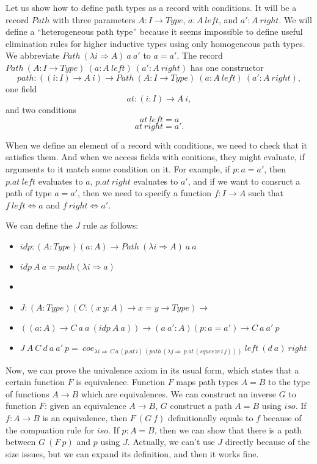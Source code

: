 \documentclass{amsart}
\theoremstyle{definition}
\theoremstyle{remark}
\newcommand{\red}{\Rightarrow}
\newcommand{\deq}{\Leftrightarrow}
\numberwithin{figure}{section}
\begin{document}
Let us show how to define path types as a record with conditions.
It will be a record $Path$ with three parameters $A : I \to Type$, $a : A\ left$, and $a' : A\ right$.
We will define a ``heterogeneous path type'' because it seems impossible to define useful elimination rules for higher inductive types using only homogeneous path types.
We abbreviate $Path\ (\lambda i \red A)\ a\ a'$ to $a = a'$.
The record $Path\ (A : I \to Type)\ (a : A\ left)\ (a' : A\ right)$ has one constructor
\[ path : ((i : I) \to A\ i) \to Path\ (A : I \to Type)\ (a : A\ left)\ (a' : A\ right), \]
one field
\[ at : (i : I) \to A\ i, \]
and two conditions
\[ at\ left = a \]
\[ at\ right = a'. \]

When we define an element of a record with conditions, we need to check that it satisfies them.
And when we access fields with conitions, they might evaluate, if arguments to it match some condition on it.
For example, if $p : a = a'$, then $p.at\ left$ evaluates to $a$, $p.at\ right$ evaluates to $a'$,
and if we want to consruct a path of type $a = a'$, then we need to specify a function $f : I \to A$ such that $f\ left \deq a$ and $f\ right \deq a'$.

We can define the $J$ rule as follows:
\begin{itemize}
\item[] $idp : (A : Type) (a : A) \to Path\ (\lambda i \red A)\ a\ a$
\item[] $idp\ A\ a = path (\lambda i \red a)$
\item[]
\item[] $J : (A : Type) (C : (x\ y : A) \to x = y \to Type) \to$
\item[] \qquad $((a : A) \to C\ a\ a\ (idp\ A\ a)) \to (a\ a' : A) (p : a = a') \to C\ a\ a'\ p$
\item[] $J\ A\ C\ d\ a\ a'\ p =\ coe_{\lambda i \red \,C\,a\,(p.at\,i)\,(path\,(\lambda j \red \,p.at\,(squeeze\,i\,j)))}\ left\ (d\ a)\ right$
\end{itemize}

Now, we can prove the univalence axiom in its usual form, which states that a certain function $F$ is equivalence.
Function $F$ maps path types $A = B$ to the type of functions $A \to B$ which are equivalences.
We can construct an inverse $G$ to function $F$: given an equivalence $A \to B$, $G$ construct a path $A = B$ using $iso$.
If $f : A \to B$ is an equivalence, then $F\ (G\ f)$ definitionally equals to $f$ because of the compuation rule for $iso$.
If $p : A = B$, then we can show that there is a path between $G\ (F\ p)$ and $p$ using $J$.
Actually, we can't use $J$ directly because of the size issues, but we can expand its definition, and then it works fine.
\end{document}
